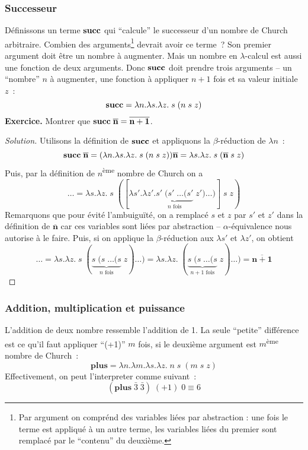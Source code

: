 \subsubsection*{Successeur}
Définissons un terme $\mathbf{succ}$ qui ``calcule'' le successeur d'un nombre de Church arbitraire.
Combien des arguments\footnote{Par argument on comprénd des variables liées par abstraction : une fois le terme est appliqué à un autre terme, les variables liées du premier sont remplacé par le ``contenu'' du deuxième.} devrait avoir ce terme~?
Son premier argument doit être un nombre à augmenter.
Mais un nombre en $\lambda$-calcul est aussi une fonction de deux arguments.
Donc $\mathbf{succ}$ doit prendre trois arguments -- un ``nombre'' $n$ à augmenter, une fonction à appliquer $n+1$ fois et sa valeur initiale $z$~:
$$\mathbf{succ} = \lambda n. \lambda s. \lambda z. \; s \; (n \; s \; z)$$
\textbf{Exercice.} Montrer que $\mathbf{succ} \; \mathbf{\overline{n}} = \mathbf{\overline{n+1}}$.
\begin{proof}[Solution]
	Utilisons la définition de $\mathbf{succ}$ et appliquons la $\beta$-réduction de $\lambda n$~:
	\[
		\mathbf{succ} \; \mathbf{\overline{n}}
		= (\lambda n. \lambda s. \lambda z. \; s \; (n \; s \; z)) \mathbf{\overline{n}}
		= \lambda s. \lambda z. \; s \; (\mathbf{\overline{n}} \; s \; z)
	\]
	Puis, par la définition de $n$\textsuperscript{ème} nombre de Church on a
	\[
		\ldots = \lambda s. \lambda z. \; s \; ([\lambda s'. \lambda z'. \underbrace{s' \; (s' \; \ldots (s'}_{n\text{ fois}} \; z') \ldots )] \; s \; z)
	\]
	Remarquons que pour évité l'ambuiguïté, on a remplacé $s$ et $z$ par $s'$ et $z'$ dans la définition de $\mathbf{\overline{n}}$ car ces variables sont liées par abstraction -- $\alpha$-équivalence nous autorise à le faire.
	Puis, si on applique la $\beta$-réduction aux $\lambda s'$ et $\lambda z'$, on obtient
	\[
		\ldots 
		= \lambda s. \lambda z. \; s \; (\underbrace{s \; (s \; \ldots (s}_{n\text{ fois}} \; z) \ldots )
		= \lambda s. \lambda z. \; (\underbrace{s \; (s \; \ldots (s}_{n+1\text{ fois}} \; z) \ldots)
		= \mathbf{\overline{n+1}}
	\]
\end{proof}

\subsubsection*{Addition, multiplication et puissance}
L'addition de deux nombre ressemble l'addition de 1.
La seule ``petite'' différence est ce qu'il faut appliquer ``(+1)'' $m$ fois, si le deuxième argument est $m$\textsuperscript{ème} nombre de Church~:
$$\mathbf{plus} = \lambda n. \lambda m. \lambda s. \lambda z. \; n \; s \; (m \; s \; z)$$
Effectivement, on peut l'interpreter comme suivant~:
$$(\mathbf{plus} \; \bar{3} \; \bar{3}) \; (+1) \; 0 \equiv 6$$

